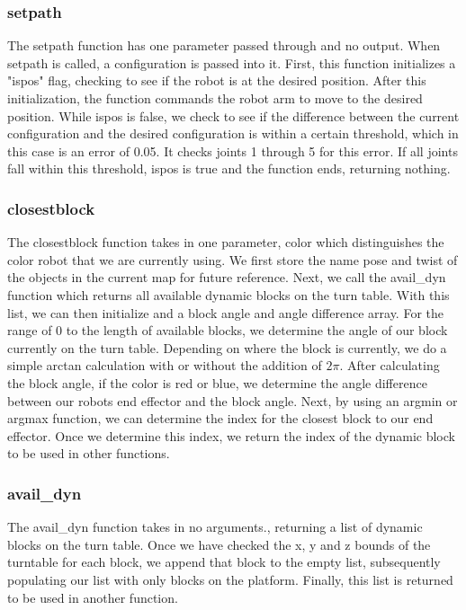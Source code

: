 \documentclass{article}
\begin{document}
    \subsubsection{setpath}
    The setpath function has one parameter passed through and no output.  When setpath is called, a configuration is passed into it.  First, this function initializes a "ispos" flag, checking to see if the robot is at the desired position.  After this initialization, the function commands the robot arm to move to the desired position.  While ispos is false, we check to see if the difference between the current configuration and the desired configuration is within a certain threshold, which in this case is an error of 0.05.  It checks joints 1 through 5 for this error.  If all joints fall within this threshold, ispos is true and the function ends, returning nothing.
    
    \subsubsection{closestblock}
    The closestblock function takes in one parameter, color which distinguishes the color robot that we are currently using.  We first store the name pose and twist of the objects in the current map for future reference.  Next, we call the avail\_dyn function which returns all available dynamic blocks on the turn table.  With this list, we can then initialize and a block angle and angle difference array.  For the range of 0 to the length of available blocks, we determine the angle of our block currently on the turn table.  Depending on where the block is currently, we do a simple arctan calculation with or without the addition of $2\pi$.  After calculating the block angle, if the color is red or blue, we determine the angle difference between our robots end effector and the block angle.  Next, by using an argmin or argmax function, we can determine the index for the closest block to our end effector.  Once we determine this index, we return the index of the dynamic block to be used in other functions.  
    
    \subsubsection{avail\_dyn}
    The avail\_dyn function takes in no arguments., returning a list of dynamic blocks on the turn table.  Once we have checked the x, y and z bounds of the turntable for each block, we append that block to the empty list, subsequently populating our list with only blocks on the platform.  Finally, this list is returned to be used in another function.
    
\end{document}

